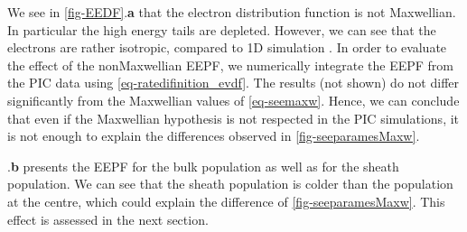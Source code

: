  We see in \cref{fig-EEDF}.{\bf a} that the electron distribution function is not Maxwellian.
 In particular the high energy tails are depleted.
 However, we can see that the electrons are rather isotropic, compared to \ac{1D} simulation \citep{sydorenko2006}.
 In order to evaluate the effect of the nonMaxwellian EEPF, we numerically integrate the EEPF from the PIC data using \vref{eq-ratedifinition_evdf}.
The results (not shown) do not differ significantly from the Maxwellian values of \vref{eq-seemaxw}.
Hence, we can conclude that even if the Maxwellian hypothesis is not respected in the
PIC simulations, it is not enough to explain the differences observed in \vref{fig-seeparamesMaxw}.


.{\bf b} presents the EEPF for the bulk population as well as for the sheath population.
 We can see that the sheath population is colder than the population at the centre, which could explain the difference of \vref{fig-seeparamesMaxw}. 
 This effect is assessed in the next section.



 